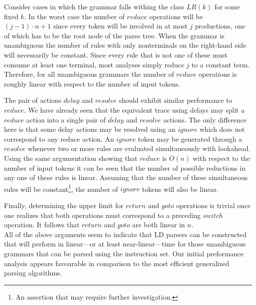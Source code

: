 \documentclass[a4paper,11pt]{article}
\begin{document}
Consider cases in which the grammar falls withing the class $LR(k)$ for some fixed $k$.
In the worst case the number of $reduce$ operations will be $(j - 1) \cdot n + 1$ since every token will be involved in at most $j$ productions, one of which has to be the root node of the parse tree.
When the grammar is unambiguous the number of rules with only nonterminals on the right-hand side will necessarily be constant.
Since every rule that is not one of these must consume at least one terminal, most analyses simply reduce $j$ to a constant term.
Therefore, for all unambiguous grammars the number of $reduce$ operations is roughly linear with respect to the number of input tokens.


The pair of actions $delay$ and $resolve$ should exhibit similar performance to $reduce$.
We have already seen that the equivalent trace using delays may split a $reduce$ action into a single pair of $delay$ and $resolve$ actions.
The only difference here is that some delay actions may be resolved using an $ignore$ which does not correspond to any reduce action.
An $ignore$ token may be generated through a $resolve$ whenever two or more rules are evaluated simultaneously with lookahead. 
Using the same argumentation showing that $reduce$ is $O(n)$ with respect to the number of input tokens it can be seen that the number of possible reductions in any one of these rules is linear.
Assuming that the number of these simultaneous rules will be constant\footnote{An assertion that may require further investigation.}, the number of $ignore$ tokens will also be linear.

Finally, determining the upper limit for $return$ and $goto$ operations is trivial once one realizes that both operations must correspond to a preceding $switch$ operation. 
It follows that $return$ and $goto$ are both linear in $n$.\\

All of the above arguments seem to indicate that LD parsers can be constructed that will perform in linear---or at least near-linear---time for those unambiguous grammars that can be parsed using the instruction set.
Our initial preformance analysis appears favourable in comparison to the most efficient generalized parsing algorithms.
\end{document}
